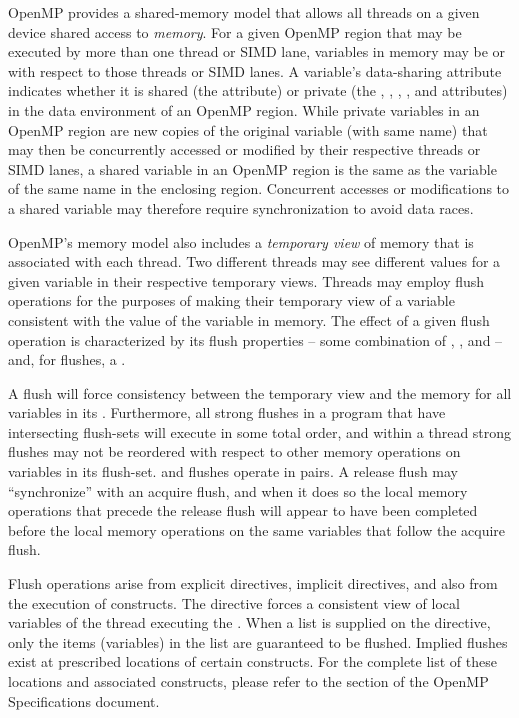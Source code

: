 \label{chap:memory_model}

OpenMP provides a shared-memory model that allows all threads on a given
device shared access to \emph{memory}. For a given OpenMP region that may be
executed by more than one thread or SIMD lane, variables in memory may be
 or  with respect to those threads or SIMD lanes. A
variable's data-sharing attribute indicates whether it is shared (the
 attribute) or private (the , ,
, , and  attributes) in the data
environment of an OpenMP region. While private variables in an OpenMP region
are new copies of the original variable (with same name) that may then be
concurrently accessed or modified by their respective threads or SIMD lanes, a
shared variable in an OpenMP region is the same as the variable of the same
name in the enclosing region. Concurrent accesses or modifications to a
shared variable may therefore require synchronization to avoid data races.

OpenMP's memory model also includes a \emph{temporary view} of memory that is
associated with each thread. Two different threads may see different values for
a given variable in their respective temporary views. Threads may employ flush
operations for the purposes of making their temporary view of a variable
consistent with the value of the variable in memory. The effect of a given
flush operation is characterized by its flush properties -- some combination of
, , and  -- and, for 
flushes, a .

A  flush will force consistency between the temporary view and the
memory for all variables in its .  Furthermore, all strong flushes in a
program that have intersecting flush-sets will execute in some total order, and
within a thread strong flushes may not be reordered with respect to other
memory operations on variables in its flush-set.  and
 flushes operate in pairs. A release flush may ``synchronize''
with an acquire flush, and when it does so the local memory operations that
precede the release flush will appear to have been completed before the local
memory operations on the same variables that follow the acquire flush.

Flush operations arise from explicit  directives, implicit
 directives, and also from the execution of 
constructs. The  directive forces a  consistent view of local
variables of the thread executing the .  When a list is supplied on
the directive, only the items (variables) in the list are guaranteed to be
flushed.  Implied flushes exist at prescribed locations of certain constructs.
For the complete list of these locations and associated constructs, please
refer to the  section of the OpenMP Specifications
document.

